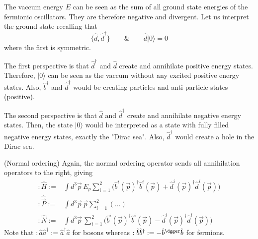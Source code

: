 \vspace{2ex}
\begin{rmk}
The vaccum energy $E$ can be seen as the sum of all ground state energies of the fermionic oscillators. They are therefore negative and divergent. Let us interpret the ground state recalling that 
\[\{\hat{d},\hat{d}^{\dagger}\}\qquad\&\qquad \hat{d}|0\rangle =0\]
where the first is symmetric.

\bigskip

The first perspective is that $\hat{d}^{\dagger}$ and $\hat{d}$ create and annihilate positive energy states. Therefore, $|0\rangle $ can be seen as the vaccum without any excited positive energy states. Also, $\hat{b}^{\dagger}$ and $\hat{d}^{\dagger}$ would be creating particles and anti-particle states (positive). 

\bigskip

The second perspective is that $\hat{d}$ and $\hat{d}^{\dagger}$ create and annihilate negative energy states. Then, the state $|0\rangle $ would be interpreted as a state with fully filled negative energy states, exactly the "Dirac sea". Also, $\hat{d}^{\dagger}$ would create a hole in the Dirac sea. 
\end{rmk}
\vspace{2ex}
\begin{defi}
(Normal ordering) Again, the normal ordering operator sends all annihilation operators to the right, giving
\[\begin{align*}
:\hat{H}:=&\int d^3\vec{p}\,E_{p}\sum ^{2}_{i=1}\Big(\hat{b}^{i}(\vec{p})^{\dagger}\hat{b}^{i}(\vec{p})+\hat{d}^{i}(\vec{p})^{\dagger}\hat{d}^{i}(\vec{p})\Big)\\
:\hat{\vec{P}}:=&\int d^3\vec{p}\,\vec{p}\sum ^{2}_{i=1}(\ldots )\\
:\hat{N}:=&\int d^3\vec{p}\,\sum ^{2}_{i=1}\Big(\hat{b}^{i}(\vec{p})^{\dagger}\hat{b}^{i}(\vec{p})-\hat{d}^{i}(\vec{p})^{\dagger}\hat{d}^{i}(\vec{p})\Big)
\end{align*}\]
Note that $:\hat{a}\hat{a}^{\dagger}:=\hat{a}^{\dagger}\hat{a}$ for bosons whereas $:\hat{b}\hat{b}^{\dagger}:=-\hat{b}^{\dgger}\hat{b}$ for fermions.
\end{defi}
\vspace{2ex}

